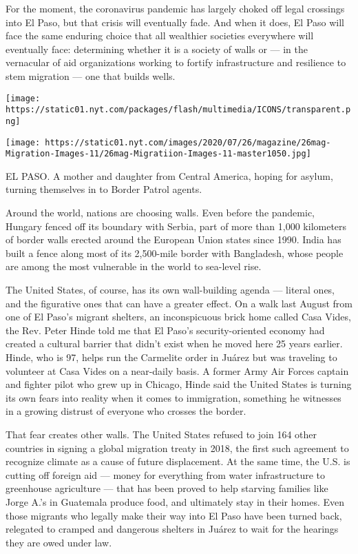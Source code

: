 For the moment, the coronavirus pandemic has largely choked off legal
crossings into El Paso, but that crisis will eventually fade. And when
it does, El Paso will face the same enduring choice that all wealthier
societies everywhere will eventually face: determining whether it is a
society of walls or --- in the vernacular of aid organizations working
to fortify infrastructure and resilience to stem migration --- one that
builds wells.

\texttt{[image: https://static01.nyt.com/packages/flash/multimedia/ICONS/transparent.png]}

\texttt{[image: https://static01.nyt.com/images/2020/07/26/magazine/26mag-Migration-Images-11/26mag-Migratiion-Images-11-master1050.jpg]}

EL PASO. A mother and daughter from Central America, hoping for asylum,
turning themselves in to Border Patrol agents.

Around the world, nations are choosing walls. Even before the pandemic,
Hungary fenced off its boundary with Serbia, part of more than 1,000
kilometers of border walls erected around the European Union states
since 1990. India has built a fence along most of its 2,500-mile border
with Bangladesh, whose people are among the most vulnerable in the world
to sea-level rise.

The United States, of course, has its own wall-building agenda ---
literal ones, and the figurative ones that can have a greater effect. On
a walk last August from one of El Paso's migrant shelters, an
inconspicuous brick home called Casa Vides, the Rev. Peter Hinde told me
that El Paso's security-oriented economy had created a cultural barrier
that didn't exist when he moved here 25 years earlier. Hinde, who is 97,
helps run the Carmelite order in Juárez but was traveling to volunteer
at Casa Vides on a near-daily basis. A former Army Air Forces captain
and fighter pilot who grew up in Chicago, Hinde said the United States
is turning its own fears into reality when it comes to immigration,
something he witnesses in a growing distrust of everyone who crosses the
border.

That fear creates other walls. The United States refused to join 164
other countries in signing a global migration treaty in 2018, the first
such agreement to recognize climate as a cause of future displacement.
At the same time, the U.S. is cutting off foreign aid --- money for
everything from water infrastructure to greenhouse agriculture --- that
has been proved to help starving families like Jorge A.'s in Guatemala
produce food, and ultimately stay in their homes. Even those migrants
who legally make their way into El Paso have been turned back, relegated
to cramped and dangerous shelters in Juárez to wait for the hearings
they are owed under law.

